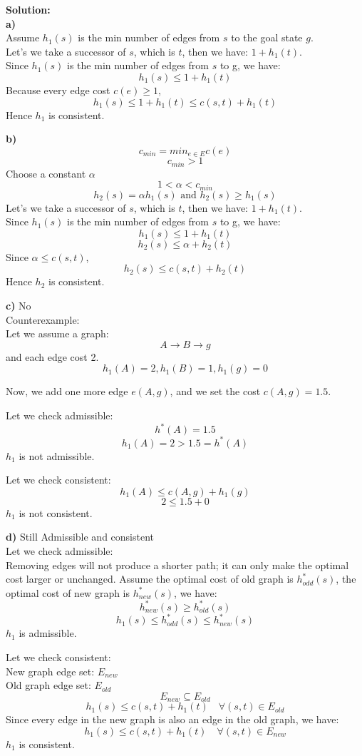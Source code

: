 \documentclass[11pt]{article}
\begin{document}
\begin{enumerate}[label=\textbf{\arabic*.}, leftmargin=*]
    \textbf{Solution:}\\
    \textbf{a)}\\
    Assume $h_1(s)$ is the min number of edges from $s$ to the goal state $g$.\\
    Let's we take a successor of $s$, which is $t$, then we have: $1 + h_1(t)$.\\
    Since $h_1(s)$ is the min number of edges from $s$ to g, we have:
    \[h_1(s) \le 1 + h_1(t)\]
    Because every edge cost $c(e) \ge 1$,
    \[h_1(s) \le 1 + h_1(t) \le c(s, t) + h_1(t)\]
    Hence $h_1$ is consistent.

    \textbf{b)}
\[c_{min} = min_{e \in E} c(e)\]
\[c_{min} > 1\]
Choose a constant $\alpha$
\[1 < \alpha < c_{min}\]
\[h_2(s) = \alpha h_1(s) \text{ and } h_2(s) \ge h_1(s)\]
    Let's we take a successor of $s$, which is $t$, then we have: $1 + h_1(t)$.\\
    Since $h_1(s)$ is the min number of edges from $s$ to g, we have:
    \[h_1(s) \le 1 + h_1(t)\]
    \[h_2(s) \le \alpha + h_2(t)\]
    Since $\alpha \le c(s, t)$,
    \[h_2(s) \le c(s, t) + h_2(t)\]
    Hence $h_2$ is consistent.

    \textbf{c)}
    No\\
    Counterexample:\\

Let we assume a graph:
\[A \rightarrow B \rightarrow g\]
and each edge cost 2.
\[h_1(A) = 2, h_1(B) = 1, h_1(g) = 0\]

Now, we add one more edge $e(A, g)$, and we set the cost $c(A, g) = 1.5$.

Let we check admissible:
\[h^*(A) = 1.5\]
\[h_1(A) = 2 > 1.5 = h^*(A)\]
$h_1$ is not admissible.

Let we check consistent:
\[h_1(A) \le c(A, g) + h_1(g)\]
\[2 \le 1.5 + 0\]
$h_1$ is not consistent.

    \textbf{d)}
Still Admissible and consistent\\

Let we check admissible:\\
Removing edges will not produce a shorter path; it can only make the optimal cost larger or unchanged.
Assume the optimal cost of old graph is $h^*_{odd}(s)$, the optimal cost of new graph is $h^*_{new}(s)$, we have:
\[h^*_{new}(s) \ge h^*_{old}(s)\]
\[h_1(s) \le h^*_{odd}(s) \le h^*_{new}(s)\]
$h_1$ is admissible.

Let we check consistent:\\
New graph edge set: $E_{new}$\\
Old graph edge set: $E_{old}$
\[E_{new} \subseteq E_{old}\]
\[h_1(s) \le c(s, t) + h_1(t) \quad \forall (s, t) \in E_{old}\]
Since every edge in the new graph is also an edge in the old graph, we have:
\[h_1(s) \le c(s, t) + h_1(t) \quad \forall (s, t) \in E_{new}\]
$h_1$ is consistent.
    

\end{enumerate}
\end{document}

